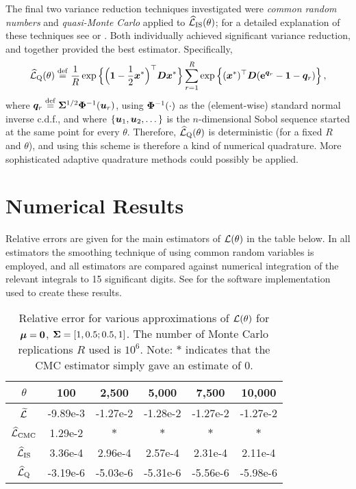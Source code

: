 The final two variance reduction techniques investigated were \emph{common
  random numbers} and \emph{quasi-Monte Carlo} applied to
$\widehat{\mathcal{L}}_{\mathrm{IS}}(\theta)$; for a detailed explanation of
these techniques see \cite{glasserman2003monte} or
\cite{asmussen2007stochastic}. Both individually achieved significant variance
reduction, and together provided the best estimator. Specifically,
%
\[ \widehat{\mathcal{L}}_{\mathrm{Q}}(\theta) \overset{\mathrm{def}}{=} \frac{1}{R} \exp\Big\{
\Big(\bm{1} - \frac12 \bm{x}^* \Big)^\top \bm{D} \bm{x}^* \Big\}  \sum_{r=1}^R
\exp\left\{ (\bm{x}^*)^\top \bm{D} (\bm{\mathrm{e}}^{\bm{q}_r} - \bm{1} - \bm{q}_r) \right\}, \]
%
where $\bm{q}_r \overset{\mathrm{def}}{=} \bm{\Sigma}^{1/2} \mathrm{\bf\Phi}^{-1}(\bm{u}_r)$, using
$\mathrm{\bf\Phi}^{-1}(\cdot)$ as the (element-wise) standard normal inverse
c.d.f., and where $\{\bm{u}_1, \bm{u}_2, \dots\}$ is the $n$-dimensional Sobol
sequence started at the same point for every $\theta$. Therefore,
$\widehat{\mathcal{L}}_{\mathrm{Q}}(\theta)$ is deterministic (for a fixed $R$
and $\theta$), and using this scheme is therefore a kind of numerical
quadrature. More sophisticated adaptive quadrature methods could possibly be
applied.

\section{Numerical Results}\label{S:Num}

Relative errors are given for the main estimators of $\mathcal{L}(\theta)$ in the
table below. In all estimators the smoothing technique of using common random
variables is employed, and all estimators are compared against numerical
integration of the relevant integrals to 15 significant digits. See \cite{CodeLaplaceSLN} for the software implementation used to create these results.

\begin{table}[ht]
\centering
\caption{Relative error for various approximations of $\mathcal{L}(\theta)$ for
  $\bm{\mu} = \bm{0}$, $\bm{\Sigma} = [1, 0.5; 0.5, 1]$. The number of Monte Carlo
  replications $R$ used is $10^6$. Note: $*$ indicates that the CMC estimator
  simply gave an estimate of 0.}
\vspace{3pt}
\begin{tabular}{cccccc}
\hline
{$\theta$}& 100 & 2{,}500 & 5{,}000 & 7{,}500 & 10{,}000 \\ \hline
$\widetilde{\Laplace}$\raisebox{1pt}{\vphantom{$\widetilde{\Laplace}$}}&
{-9.89e-3 }&{-1.27e-2 }&{-1.28e-2 }&{-1.27e-2 }&{-1.27e-2 }\\
{$\widehat{\mathcal{L}}_{\mathrm{CMC}}$}&
{1.29e-2 }&{$*$}&{$*$}&{$*$}&{$*$} \\
{$\widehat{\mathcal{L}}_{\mathrm{IS}}$}&
{3.36e-4 }&{2.96e-4 }&{2.57e-4 }&{2.31e-4 }&{2.11e-4 } \\
{$\widehat{\mathcal{L}}_{\mathrm{Q}}$}&
{-3.19e-6 }&{-5.03e-6 }&{-5.31e-6}&{-5.56e-6 }&{-5.98e-6 } \\ \hline
\end{tabular}
\end{table}

